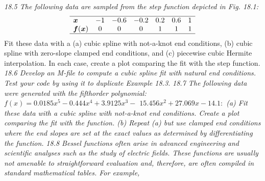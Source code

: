 \documentclass[../main.tex]{subfiles}
\begin{document}
\begin{multicols}{2}
        \noindent\textit{18.5 The following data are sampled from the step function depicted in Fig. 18.1:}
        $$
        \begin{array}{lcccccc}
            \hline \boldsymbol{x} & -1 & -0.6 & -0.2 & 0.2 & 0.6 & 1 \\
            \boldsymbol{f}(\boldsymbol{x}) & 0 & 0 & 0 & 1 & 1 & 1 \\
            \hline
        \end{array}
        $$
        Fit these data with a (a) cubic spline with not-a-knot end conditions, (b) cubic spline with zero-slope clamped end conditions, and (c) piecewise cubic Hermite interpolation. In each case, create a plot comparing the fit with the step function. 
        \noindent\textit{18.6 Develop an M-file to compute a cubic spline fit with natural end conditions. Test your code by using it to duplicate Example 18.3.}
        \noindent\textit{18.7 The following data were generated with the fifthorder polynomial: $f(x)=0.0185 x^{5}-0.444 x^{4}+3.9125 x^{3}-$ $15.456 x^{2}+27.069 x-14.1:$
        (a) Fit these data with a cubic spline with not-a-knot end conditions. Create a plot comparing the fit with the function. (b) Repeat (a) but use clamped end conditions where the end slopes are set at the exact values as determined by differentiating the function.}
        \noindent\textit{18.8 Bessel functions often arise in advanced engineering and scientific analyses such as the study of electric fields. These functions are usually not amenable to straightforward evaluation and, therefore, are often compiled in standard mathematical tables. For example,}
        

\end{multicols}
\end{document}

